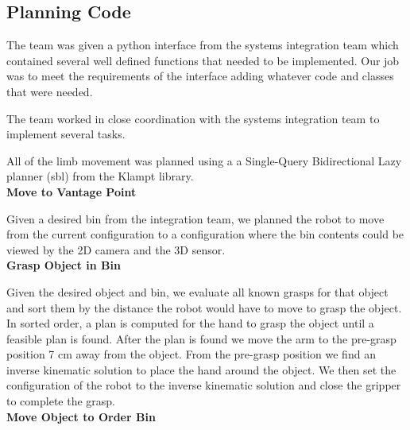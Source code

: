 \documentclass[12pt]{article}
\begin{document}
\subsection{Planning Code}
The team was given a python interface from the systems integration team which contained several well defined functions that needed to be implemented. Our job was to meet the requirements of the interface adding whatever code and classes that were needed.

The team worked in close coordination with the systems integration team to implement several tasks.

All of the limb movement was planned using a a Single-Query Bidirectional Lazy planner (sbl) from the Klampt library.\\

\noindent\textbf{Move to Vantage Point}

Given a desired bin from the integration team, we planned the robot to move from the current configuration to a configuration where the bin contents could be viewed by the 2D camera and the 3D sensor.\\

\noindent\textbf{Grasp Object in Bin}

Given the desired object and bin, we evaluate all known grasps for that object and sort them by the distance the robot would have to move to grasp the object. In sorted order, a plan is computed for the hand to grasp the object until a feasible plan is found. After the plan is found we move the arm to the pre-grasp position 7 cm away from the object. From the pre-grasp position we find an inverse kinematic solution to place the hand around the object. We then set the configuration of the robot to the inverse kinematic solution and close the gripper to complete the grasp.\\

\noindent\textbf{Move Object to Order Bin}
\end{document}
